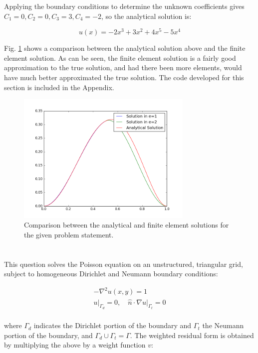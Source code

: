 \documentclass[10pt]{article}
\newcommand{\beq}{\begin{equation}}
\newcommand{\eeq}{\end{equation}}
\newcommand{\beqa}{\begin{equation}\begin{aligned}}
\newcommand{\eeqa}{\end{aligned}\end{equation}}
\begin{document}
Applying the boundary conditions to determine the unknown coefficients gives \(C_1=0, C_2=0, C_3=3, C_4=-2\), so the analytical solution is:

\beq
u(x)=-2x^3+3x^2+4x^5-5x^4
\eeq

Fig. \ref{fig:2} shows a comparison between the analytical solution above and the finite element solution. As can be seen, the finite element solution is a fairly good approximation to the true solution, and had there been more elements, would have much better approximated the true solution. The code developed for this section is included in the Appendix.

\begin{figure}[H]
\centering
\includegraphics[width=0.75\textwidth]{q3_soln.png}
\caption{Comparison between the analytical and finite element solutions for the given problem statement.}
\label{fig:2}
\end{figure}

\section{}

This question solves the Poisson equation on an unstructured, triangular grid, subject to homogeneous Dirichlet and Neumann boundary conditions:

\beqa
-\nabla^2u(x,y)=1\\
u\rvert_{\Gamma_d}=0,\quad \hat{n}\cdot\nabla u\rvert_{\Gamma_t}=0\\
\eeqa

where \(\Gamma_d\) indicates the Dirichlet portion of the boundary and \(\Gamma_t\) the Neumann portion of the boundary, and \(\Gamma_d\cup\Gamma_t=\Gamma\). The weighted residual form is obtained by multiplying the above by a weight function \(v\):
\end{document}
